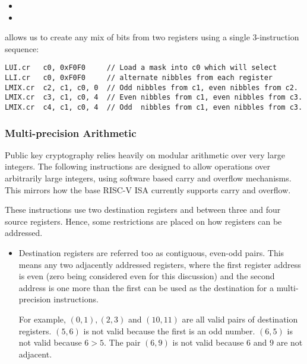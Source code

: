 \begin{itemize}
\item {}
\item {}
\end{itemize}

 allows us to create any mix of bits from two registers
using a single 3-instruction sequence:

\begin{lstlisting}[style=float]
LUI.cr   c0, 0xF0F0     // Load a mask into c0 which will select
LLI.cr   c0, 0xF0F0     // alternate nibbles from each register
LMIX.cr  c2, c1, c0, 0  // Odd nibbles from c1, even nibbles from c2.
LMIX.cr  c3, c1, c0, 4  // Even nibbles from c1, even nibbles from c3.
LMIX.cr  c4, c1, c0, 4  // Odd  nibbles from c1, even nibbles from c3.
\end{lstlisting}

\subsubsection{Multi-precision Arithmetic}

Public key cryptography relies heavily on modular arithmetic over very
large integers. The following instructions are designed to allow
operations over arbitrarily large integers, using software based carry
and overflow mechanisms. This mirrors how the base RISC-V ISA currently
supports carry and overflow.

These instructions use two destination registers and between three
and four source registers. Hence, some restrictions are placed on how
registers can be addressed.

\begin{itemize}
\item Destination registers are referred too as contiguous, even-odd
pairs. This means any two adjacently addressed registers, where the
first register address is even (zero being considered even for this
discussion) and the second address is one more than the first can be
used as the destination for a multi-precision instructions. 

For example, $(0,1), (2,3)$ and $(10,11)$ are all valid
pairs of destination registers. $(5,6)$ is not valid because the first
is an odd number. $(6,5)$ is not valid because $6 > 5$. The pair $(6,9)$
is not valid because $6$ and $9$ are not adjacent.
\end{itemize}

